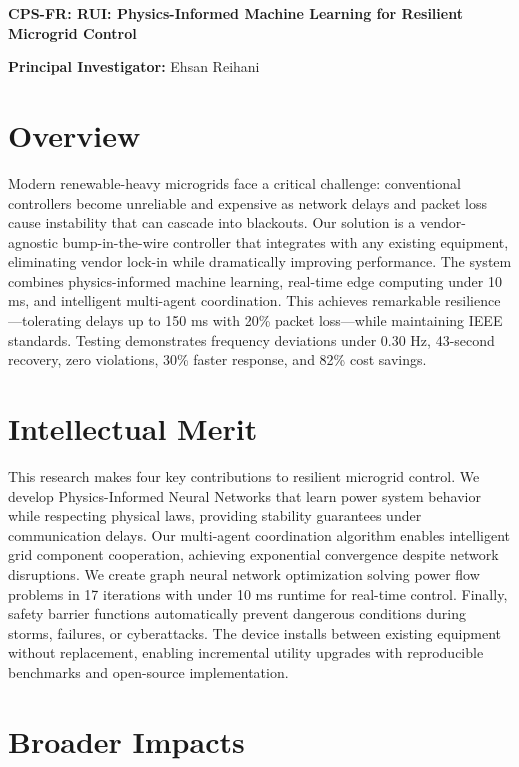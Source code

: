 \documentclass[11pt]{article}
\begin{document}
\textbf{\large CPS-FR: RUI: Physics-Informed Machine Learning for Resilient Microgrid Control}

\textbf{Principal Investigator:} Ehsan Reihani

\section*{Overview}

Modern renewable-heavy microgrids face a critical challenge: conventional controllers become unreliable and expensive as network delays and packet loss cause instability that can cascade into blackouts. Our solution is a vendor-agnostic bump-in-the-wire controller that integrates with any existing equipment, eliminating vendor lock-in while dramatically improving performance. The system combines physics-informed machine learning, real-time edge computing under 10 ms, and intelligent multi-agent coordination. This achieves remarkable resilience---tolerating delays up to 150 ms with 20\% packet loss---while maintaining IEEE standards. Testing demonstrates frequency deviations under 0.30 Hz, 43-second recovery, zero violations, 30\% faster response, and 82\% cost savings.

\section*{Intellectual Merit}

This research makes four key contributions to resilient microgrid control. We develop Physics-Informed Neural Networks that learn power system behavior while respecting physical laws, providing stability guarantees under communication delays. Our multi-agent coordination algorithm enables intelligent grid component cooperation, achieving exponential convergence despite network disruptions. We create graph neural network optimization solving power flow problems in 17 iterations with under 10 ms runtime for real-time control. Finally, safety barrier functions automatically prevent dangerous conditions during storms, failures, or cyberattacks. The device installs between existing equipment without replacement, enabling incremental utility upgrades with reproducible benchmarks and open-source implementation.

\section*{Broader Impacts}
\end{document}
